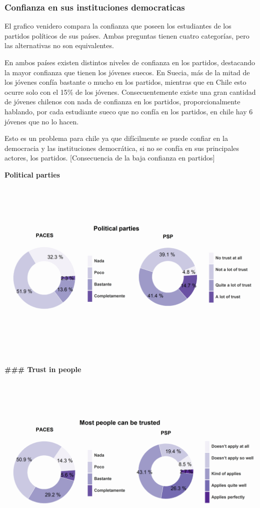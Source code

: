 \documentclass[12pt,twoside]{templates/facsothesis}
\begin{document}
\hypertarget{confianza-en-sus-instituciones-democraticas}{%
\subsubsection{Confianza en sus instituciones democraticas}\label{confianza-en-sus-instituciones-democraticas}}

El grafico venidero compara la confianza que poseen los estudiantes de los partidos políticos de sus países. Ambas preguntas tienen cuatro categorías, pero las alternativas no son equivalentes.

En ambos países existen distintos niveles de confianza en los partidos, destacando la mayor confianza que tienen los jóvenes suecos. En Suecia, más de la mitad de los jóvenes confía bastante o mucho en los partidos, mientras que en Chile esto ocurre solo con el 15\% de los jóvenes. Consecuentemente existe una gran cantidad de jóvenes chilenos con nada de confianza en los partidos, proporcionalmente hablando, por cada estudiante sueco que no confía en los partidos, en chile hay 6 jóvenes que no lo hacen.

Esto es un problema para chile ya que difícilmente se puede confiar en la democracia y las instituciones democrática, si no se confía en sus principales actores, los partidos.
{[}Consecuencia de la baja confianza en partidos{]}

\textbf{Political parties}

\includegraphics{output/plotru4.png}

\textbf{\#\#\# Trust in people}

\includegraphics{output/plotru5.png}
\end{document}
